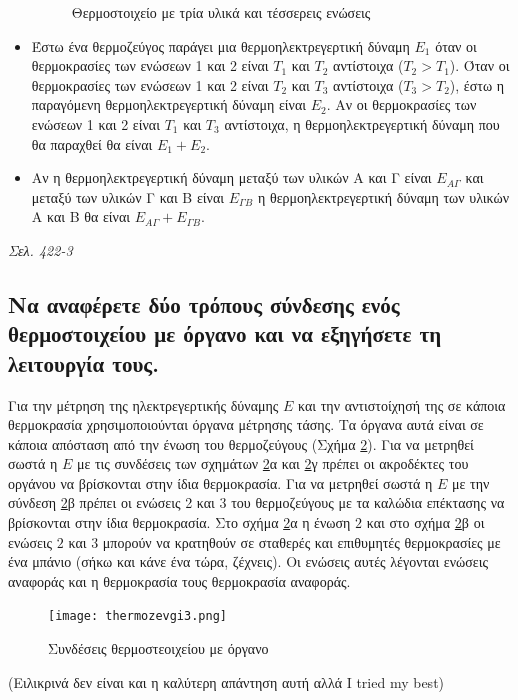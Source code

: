 \documentclass{article}
\begin{document}
\begin{itemize}
\begin{figure}[h!]
            \caption{Θερμοστοιχείο με τρία υλικά και τέσσερεις ενώσεις}
            \label{fig:7.1thermo2}
        \end{figure}
    \item Έστω ένα θερμοζεύγος παράγει μια θερμοηλεκτρεγερτική δύναμη $E_1$ όταν οι θερμοκρασίες των ενώσεων 1 και 2 είναι $T_1$ και $T_2$ αντίστοιχα ($Τ_2 > Τ_1$). Όταν οι 
        θερμοκρασίες των ενώσεων 1 και 2 είναι $T_2$ και $T_3$ αντίστοιχα ($Τ_3 > Τ_2$), έστω η παραγόμενη θερμοηλεκτρεγερτική δύναμη είναι $E_2$. Αν οι θερμοκρασίες των 
        ενώσεων 1 και 2 είναι $T_1$ και $T_3$ αντίστοιχα, η θερμοηλεκτρεγερτική δύναμη που θα παραχθεί θα είναι $E_1+E_2$. \item Αν η θερμοηλεκτρεγερτική δύναμη 
        μεταξύ των υλικών Α και Γ είναι $E_{A\Gamma}$ και μεταξύ των υλικών Γ και Β είναι $E_{\Gamma B}$ η θερμοηλεκτρεγερτική δύναμη των υλικών Α και Β θα είναι 
        $E_{A\Gamma} + E_{\Gamma B}$.
\end{itemize}

\emph{Σελ. 422-3}

\subsection{Να αναφέρετε δύο τρόπους σύνδεσης ενός θερμοστοιχείου με όργανο και να εξηγήσετε τη λειτουργία τους.}
Για την μέτρηση της ηλεκτρεγερτικής δύναμης $E$ και την αντιστοίχησή της σε κάποια θερμοκρασία χρησιμοποιούνται όργανα μέτρησης τάσης. Τα όργανα αυτά είναι σε 
κάποια απόσταση από την ένωση του θερμοζεύγους (Σχήμα \ref{thermozevgi3}). Για να μετρηθεί σωστά η $E$ με τις συνδέσεις των σχημάτων \ref{thermozevgi3}α και 
\ref{thermozevgi3}γ πρέπει οι ακροδέκτες του οργάνου να βρίσκονται στην ίδια θερμοκρασία. Για να μετρηθεί σωστά η $E$ με την σύνδεση \ref{thermozevgi3}β πρέπει οι 
ενώσεις 2 και 3 του θερμοζεύγους με τα καλώδια επέκτασης να βρίσκονται στην ίδια θερμοκρασία.  Στο σχήμα \ref{thermozevgi3}α η ένωση $2$ και στο σχήμα 
\ref{thermozevgi3}β οι ενώσεις $2$ και $3$ μπορούν να κρατηθούν σε σταθερές και επιθυμητές θερμοκρασίες με ένα μπάνιο (σήκω και κάνε ένα τώρα, ζέχνεις). 
Οι ενώσεις αυτές λέγονται ενώσεις αναφοράς και η θερμοκρασία τους θερμοκρασία αναφοράς. 

\begin{figure}[h!]
    \texttt{[image: thermozevgi3.png]}
    \caption{Συνδέσεις θερμοστεοιχείου με όργανο}
    \label{thermozevgi3}
\end{figure}

(Ειλικρινά δεν είναι και η καλύτερη απάντηση αυτή αλλά \foreignlanguage{english}{I tried my best})
\end{document}

